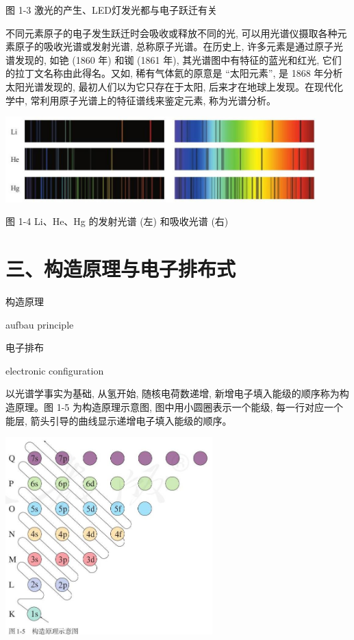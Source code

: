 \documentclass[10pt]{article}
\begin{document}
图 1-3 激光的产生、LED灯发光都与电子跃迁有关

不同元素原子的电子发生跃迁时会吸收或释放不同的光, 可以用光谱仪摄取各种元素原子的吸收光谱或发射光谱, 总称原子光谱。在历史上, 许多元素是通过原子光谱发现的, 如铯 (1860 年) 和铷 (1861 年), 其光谱图中有特征的蓝光和红光, 它们的拉丁文名称由此得名。又如, 稀有气体氦的原意是 “太阳元素”, 是 1868 年分析太阳光谱发现的, 最初人们以为它只存在于太阳, 后来才在地球上发现。在现代化学中, 常利用原子光谱上的特征谱线来鉴定元素, 称为光谱分析。

\begin{center}
\includegraphics[max width=0.9\textwidth]{images/0190e026-5a11-7df7-bd27-54d09026ba7a_11_758641.jpg}
\end{center}

图 1-4 Li、He、Hg 的发射光谱 (左) 和吸收光谱 (右)

\section*{三、构造原理与电子排布式}

\begin{mdframed}

构造原理

aufbau principle

电子排布

electronic configuration

\end{mdframed}

以光谱学事实为基础, 从氢开始, 随核电荷数递增, 新增电子填入能级的顺序称为构造原理。图 1-5 为构造原理示意图, 图中用小圆圈表示一个能级, 每一行对应一个能层, 箭头引导的曲线显示递增电子填入能级的顺序。

\begin{center}
\includegraphics[max width=0.6\textwidth]{images/0190e026-5a11-7df7-bd27-54d09026ba7a_11_331090.jpg}
\end{center}
\end{document}
